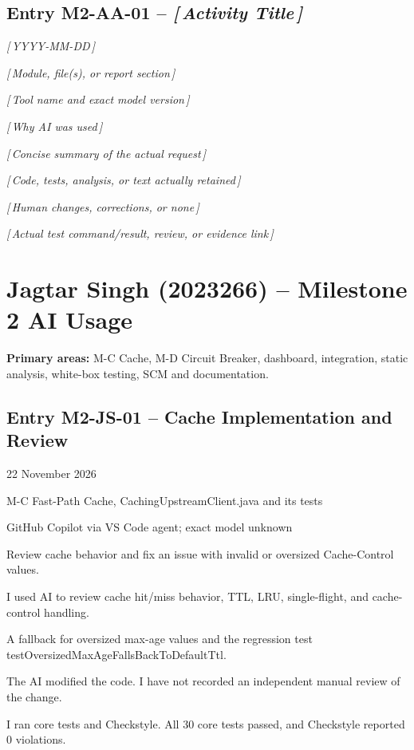 \documentclass[11pt,a4paper]{article}
\newcommand{\placeholder}[1]{\textit{[\,#1\,]}}
\newcommand{\ailogentry}[9]{
\subsection*{#1}
\begin{description}[leftmargin=3.2cm,style=nextline,font=\bfseries]
\item[Date] #2
\item[Module] #3
\item[AI Tool] #4
\item[Purpose] #5
\item[Activity] #6
\item[Used] #7
\item[Changes] #8
\item[Verification] #9
\end{description}
}
\begin{document}
\subsection*{Entry M2-AA-01 -- \placeholder{Activity Title}}
\begin{description}[leftmargin=3.6cm,style=nextline,font=\bfseries]
\item[Date] \placeholder{YYYY-MM-DD}
\item[Module / Deliverable] \placeholder{Module, file(s), or report section}
\item[Tool and Model Version] \placeholder{Tool name and exact model version}
\item[Purpose] \placeholder{Why AI was used}
\item[Prompt / Activity Summary] \placeholder{Concise summary of the actual request}
\item[Material Adopted] \placeholder{Code, tests, analysis, or text actually retained}
\item[Modifications Made] \placeholder{Human changes, corrections, or none}
\item[Verification Performed] \placeholder{Actual test command/result, review, or evidence link}
\end{description}

\clearpage


\section{Jagtar Singh (2023266) -- Milestone 2 AI Usage}

\textbf{Primary areas:} M-C Cache, M-D Circuit Breaker, dashboard,
integration, static analysis, white-box testing, SCM and documentation.

\ailogentry
{Entry M2-JS-01 -- Cache Implementation and Review}
{22 November 2026}
{M-C Fast-Path Cache, CachingUpstreamClient.java and its tests}
{GitHub Copilot via VS Code agent; exact model unknown}
{Review cache behavior and fix an issue with invalid or oversized Cache-Control values.}
{I used AI to review cache hit/miss behavior, TTL, LRU, single-flight, and cache-control handling.}
{A fallback for oversized max-age values and the regression test testOversizedMaxAgeFallsBackToDefaultTtl.}
{The AI modified the code. I have not recorded an independent manual review of the change.}
{I ran core tests and Checkstyle. All 30 core tests passed, and Checkstyle reported 0 violations.}
\end{document}
